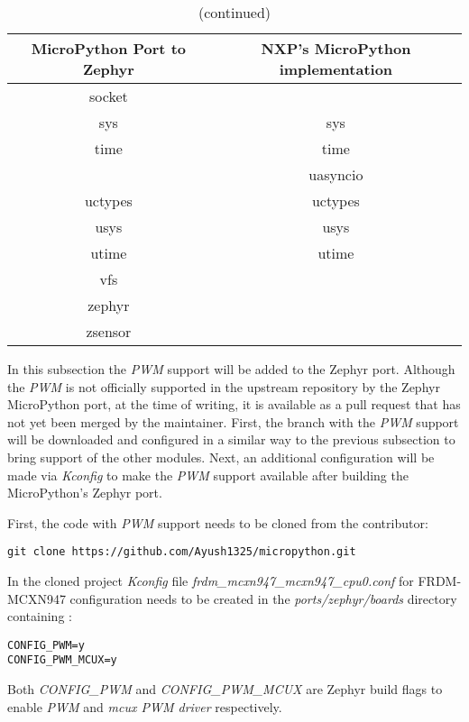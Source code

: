 \documentclass[twoside, 12pt]{article}
\begin{document}
\begin{table}[H]
\ContinuedFloat
\caption*{(continued)}
\renewcommand{\arraystretch}{1.2}
\begin{tabular}{|c|c|} \hline
\textbf{MicroPython Port to Zephyr} & \textbf{NXP's MicroPython implementation} \\ \hline
socket & \\ \hline
sys & sys \\ \hline
time & time \\ \hline
& uasyncio \\ \hline
uctypes & uctypes \\ \hline
usys & usys \\ \hline
utime & utime \\ \hline
vfs & \\ \hline
zephyr & \\ \hline
zsensor & \\ \hline
\end{tabular}
\end{table}

In this subsection the \textit{PWM} support will be added to the Zephyr port. Although the 
\textit{PWM} is not officially supported in the upstream repository by the Zephyr MicroPython 
port, at the time of writing, it is available as a pull request that has not yet been merged 
by the maintainer. First, the branch with the \textit{PWM} support will be downloaded and 
configured in a similar way to the previous subsection to bring support of the other modules. 
Next, an additional configuration will be made via \textit{Kconfig} to make the \textit{PWM} 
support available after building the MicroPython's Zephyr port.

First, the code with \textit{PWM} support needs to be cloned from the contributor:
\begin{lstlisting}[caption=Obtaining MicroPython's Zephyr port version with PWM support, breaklines=true]
git clone https://github.com/Ayush1325/micropython.git
\end{lstlisting}
In the cloned project \textit{Kconfig} file \textit{frdm\_mcxn947\_mcxn947\_cpu0.conf} for 
FRDM-MCXN947 configuration needs to be created in the  \textit{ports/zephyr/boards} directory 
containing :
\begin{lstlisting}[caption=Kconfig configuration for PWM support on FRDM-MCXN947 board]
CONFIG_PWM=y
CONFIG_PWM_MCUX=y
\end{lstlisting}

Both \textit{CONFIG\_PWM}\cite{zehpyr_pwm} and 
\textit{CONFIG\_PWM\_MCUX}\cite{zehpyr_pwm_mcux} are Zephyr build flags to enable 
\textit{PWM} and \textit{mcux PWM driver} respectively.
\end{document}
